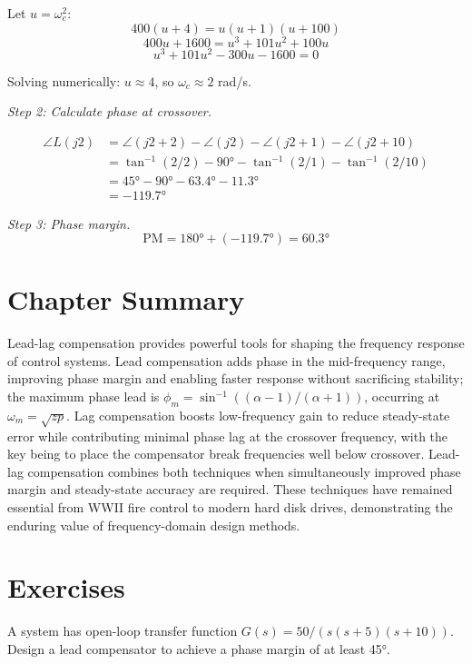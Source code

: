 Let $u = \omega_c^2$:
\[
400(u + 4) = u(u + 1)(u + 100)
\]
\[
400u + 1600 = u^3 + 101u^2 + 100u
\]
\[
u^3 + 101u^2 - 300u - 1600 = 0
\]

Solving numerically: $u \approx 4$, so $\omega_c \approx 2$ rad/s.

\textit{Step 2: Calculate phase at crossover.}

\begin{align}
\angle L(j2) &= \angle(j2 + 2) - \angle(j2) - \angle(j2 + 1) - \angle(j2 + 10) \\
&= \tan^{-1}(2/2) - 90° - \tan^{-1}(2/1) - \tan^{-1}(2/10) \\
&= 45° - 90° - 63.4° - 11.3° \\
&= -119.7°
\end{align}

\textit{Step 3: Phase margin.}
\[
\text{PM} = 180° + (-119.7°) = \boxed{60.3°}
\]

\section{Chapter Summary}
\label{sec:lead_lag_summary}

Lead-lag compensation provides powerful tools for shaping the frequency response of control systems. Lead compensation adds phase in the mid-frequency range, improving phase margin and enabling faster response without sacrificing stability; the maximum phase lead is $\phi_m = \sin^{-1}((\alpha-1)/(\alpha+1))$, occurring at $\omega_m = \sqrt{zp}$. Lag compensation boosts low-frequency gain to reduce steady-state error while contributing minimal phase lag at the crossover frequency, with the key being to place the compensator break frequencies well below crossover. Lead-lag compensation combines both techniques when simultaneously improved phase margin and steady-state accuracy are required. These techniques have remained essential from WWII fire control to modern hard disk drives, demonstrating the enduring value of frequency-domain design methods.

\newpage
\section{Exercises}
\label{sec:lead_lag_problems}

\begin{exercise}
A system has open-loop transfer function $G(s) = 50/(s(s+5)(s+10))$. Design a lead compensator to achieve a phase margin of at least 45°.
\end{exercise}

